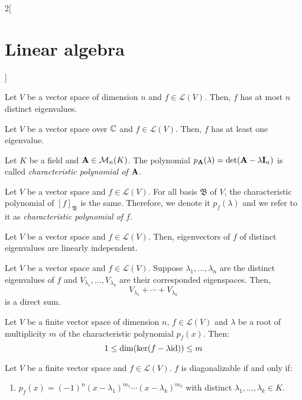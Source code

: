 \documentclass[../../../main.tex]{subfiles}
\begin{document}
\begin{multicols}{2}[\section{Linear algebra}]
\begin{lemma}
    \end{lemma}
    \begin{corollary}
        Let $V$ be a vector space of dimension $n$ and $f\in\mathcal{L}(V)$. Then, $f$ has at most $n$ distinct eigenvalues.
    \end{corollary}
    \begin{corollary}
        Let $V$ be a vector space over $\mathbb{C}$ and $f\in\mathcal{L}(V)$. Then, $f$ has at least one eigenvalue.
    \end{corollary}
    \begin{definition}
        Let $K$ be a field and $\boldsymbol{\mathrm{A}}\in\mathcal{M}_n(K)$. The polynomial $p_{\boldsymbol{\mathrm{A}}}(\lambda)=\det(\boldsymbol{\mathrm{A}}-\lambda \boldsymbol{\mathrm{I}}_n)$ is called \textit{characteristic polynomial of $\boldsymbol{\mathrm{A}}$}.
    \end{definition}
    \begin{prop}
        Let $V$ be a vector space and $f\in\mathcal{L}(V)$. For all basis $\mathfrak{B}$ of $V$, the characteristic polynomial of $[f]_\mathfrak{B}$ is the same. Therefore, we denote it $p_f(\lambda)$ and we refer to it as \textit{characteristic polynomial of $f$}.
    \end{prop}
    \begin{prop}
        Let $V$ be a vector space and $f\in\mathcal{L}(V)$. Then, eigenvectors of $f$ of distinct eigenvalues are linearly independent.
    \end{prop}
    \begin{corollary}
        Let $V$ be a vector space and $f\in\mathcal{L}(V)$. Suppose $\lambda_1,\ldots,\lambda_n$ are the distinct eigenvalues of $f$ and $V_{\lambda_1},\ldots,V_{\lambda_n}$ are their corresponded eigenspaces. Then, $$V_{\lambda_1}+\cdots+V_{\lambda_n}$$ is a direct sum.
    \end{corollary}
    \begin{prop}
        Let $V$ be a finite vector space of dimension $n$, $f\in\mathcal{L}(V)$ and $\lambda$ be a root of multiplicity $m$ of the characteristic polynomial $p_f(x)$. Then: $$1\leq \dim(\ker(f-\lambda\mathrm{id}))\leq m$$
    \end{prop}
    \begin{theorem}
        Let $V$ be a finite vector space and $f\in\mathcal{L}(V)$. $f$ is diagonalizable if and only if:
        \begin{enumerate}
            \item $p_f(x)=(-1)^n(x-\lambda_1)^{m_1}\cdots(x-\lambda_k)^{m_k}$ with distinct $\lambda_1,\ldots,\lambda_k\in K$.

\end{enumerate}
\end{theorem}
\end{multicols}
\end{document}
